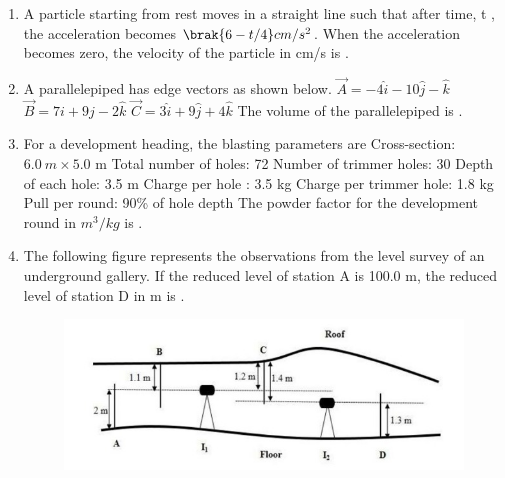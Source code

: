 \documentclass[journal,12pt,onecolumn]{IEEEtran}
\theoremstyle{remark}
\begin{document}
\begin{enumerate}
\hfill{}

\item A particle starting from rest moves in a straight line such that after time, t , the acceleration becomes $\brak{6-t/4}cm/s^{2}$. When the acceleration becomes zero, the velocity of the particle in cm/s is \underline{\hspace{2cm}} .

\hfill{}

\item A parallelepiped has edge vectors as shown below.
$\vec{A}=-4\hat{i}-10\hat{j}-\hat{k}$
$\vec{B}=7i+9j-2\hat{k}$
$\vec{C}=3\hat{i}+9\hat{j}+4\hat{k}$
The volume of the parallelepiped is \underline{\hspace{2cm}} .

\hfill{}

\item For a development heading, the blasting parameters are
Cross-section: $6.0~m\times5.0$ m
Total number of holes: 72
Number of trimmer holes: 30
Depth of each hole: 3.5 m
Charge per hole : 3.5 kg
Charge per trimmer hole: 1.8 kg
Pull per round: 90\% of hole depth
The powder factor for the development round in $m^{3}/kg$ is \underline{\hspace{2cm}} .

\hfill{}

\item The following figure represents the observations from the level survey of an underground gallery.
If the reduced level of station A is 100.0 m, the reduced level of station D in m is \underline{\hspace{2cm}} .

\hfill{}

\begin{figure}[H]
\centering
\includegraphics[width=0.9\columnwidth]{figs/2020mn48.jpeg}
\caption*{}
\label{fig:q48}
\end{figure}


\end{enumerate}
\end{document}
